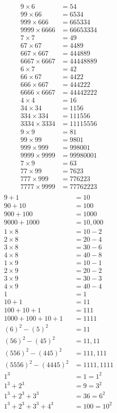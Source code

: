 \begin{align*}
9 \times 6 &= 54\\
99 \times 66 &= 6534\\
999 \times 666 &= 665334 \\
9999 \times 6666 &= 66653334\\[0.4cm]
7\times 7 &= 49\\ %
67 \times 67 &= 4489\\
667 \times 667 &= 444889 \\
6667 \times 6667 &= 44448889\\[0.4cm]
6\times 7 &= 42\\
66 \times 67 &= 4422 \\
666 \times 667 &= 444222\\
6666 \times 6667 &= 44442222\\[0.4cm]
4\times 4 &= 16\\ %
34 \times 34 &= 1156\\
334 \times 334 &= 111556\\
3334 \times 3334 &= 11115556\\[0.4cm]
9\times 9 &= 81\\ %
99\times 99&= 9801\\
999 \times 999 &= 998001\\
9999 \times 9999 &= 99980001\\[0.4cm]
7 \times 9 &= 63\\ %
77 \times 99 &= 7623\\
777 \times 999 &= 776223\\
7777 \times 9999 &= 77762223\\[0.4cm]
\end{align*}
\begin{align*}
9+1 &= 10\\ 
90+10 &= 100\\
900+100 &= 1000\\
9000+1000 &= 10,000\\[0.4cm]
1 \times 8 &= 10-2 \\%
2 \times 8 &= 20-4 \\
3 \times 8 &= 30-6 \\
4 \times 8 &= 40-8 \\[0.4cm]
1 \times 9 &= 10-1\\%
2 \times 9 &= 20-2 \\
3 \times 9 &= 30-3\\
4 \times 9 &= 40-4\\[0.4cm]
1 &= 1\\%
10+1 &= 11\\
100+10+1 &= 111\\
1000+100+10+1 &= 1111\\[0.4cm]
(6)^2-(5)^2 &= 11\\%
(56)^2-(45)^2 &= 11,11\\
(556)^2-(445)^2 &= 111,111\\
(5556)^2-(4445)^2&=1111,1111\\[0.4cm]
1^3& = 1 = 1^2\\%
1^3 + 2^3 &= 9 = 3^2\\
1^3+2^3+3^3 &= 36 = 6^2\\
1^3+2^3+3^3+4^3 &= 100 = 10^2
\end{align*}
